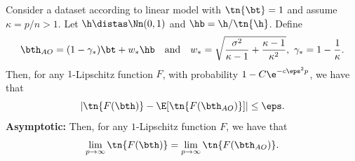 \begin{theorem}  Consider a dataset according to linear model with $\tn{\bt}=1$ and assume $\kappa=p/n>1$. Let $\h\distas\Nn(0,1)$ and $\hb=\h/\tn{\h}$. Define
\[
\bth_{AO}=(1-\gamma_*)\bt+w_*\hb\quad\text{and}\quad w_*=\sqrt{\frac{\sigma^2}{\kappa-1}+\frac{\kappa-1}{\kappa^2}},~\gamma_*=1-\frac{1}{\kappa}.
\]
Then, for any $1$-Lipschitz function $F$, with probability $1-C\e^{-c\eps^2p}$, we have that
\[
|\tn{F(\bth)}-\E[\tn{F(\bth_{AO})}]|\leq \eps.%
\]
{\bf{Asymptotic:}} Then, for any $1$-Lipschitz function $F$, we have that
\[
\lim_{p\rightarrow\infty}\tn{F(\bth)}= \lim_{p\rightarrow\infty}\tn{F(\bth_{AO})}.
\]
\end{theorem}
